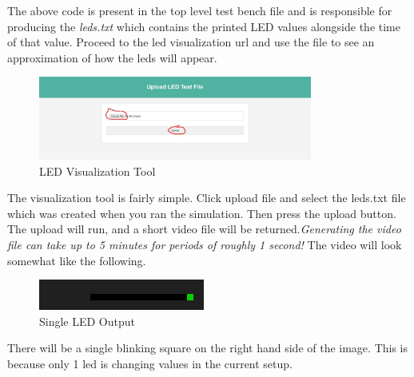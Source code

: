 \normalsize
The above code is present in the top level test bench file and is responsible for producing the \textit{leds.txt} which contains the printed LED values alongside the time of that value. Proceed to the led visualization url and use the file to see an approximation of how the leds will appear. 

\begin{figure}[H]
    \centering
    \includegraphics[width=9cm]{Images/ProvidedPWM/LED_VisualizationTool.jpg}
    \caption{LED Visualization Tool}
    \label{fig:enter-label}
\end{figure}
The visualization tool is fairly simple. Click upload file and select the leds.txt file which was created when you ran the simulation. Then press the upload button. The upload will run, and a short video file will be returned.\textit{Generating the video file can take up to 5 minutes for periods of roughly 1 second!} The video will look somewhat like the following.
\begin{figure}[H]
    \centering
    \includegraphics[height=1cm]{Images/ProvidedPWM/SingleLEDFlashing.jpg}
    \caption{Single LED Output}
    \label{fig:enter-label}
\end{figure}
There will be a single blinking square on the right hand side of the image. This is because only 1 led is changing values in the current setup.
